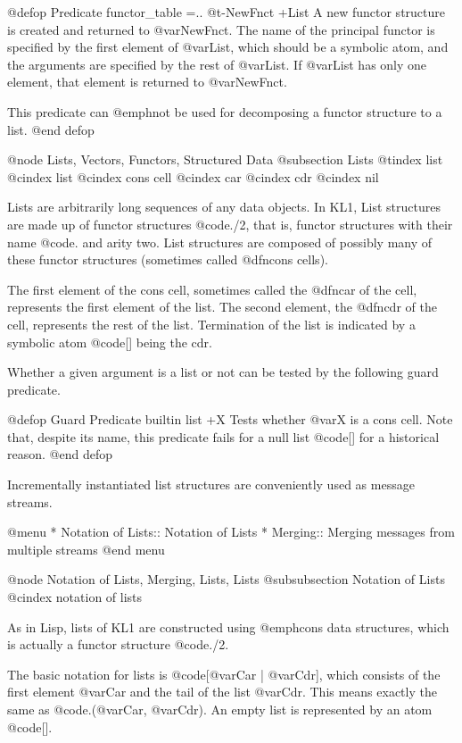 {{@defop {Predicate} {functor_table} =.. @t{-}NewFnct +List
A new functor structure is created and returned to @var{NewFnct}.  The
name of the principal functor is specified by the first element of 
@var{List}, which should be a symbolic atom, and the arguments are
specified by the rest of @var{List}.  If @var{List} has only one
element, that element is returned to @var{NewFnct}.

This predicate can @emph{not} be used for decomposing a functor
structure to a list.
@end defop

@node Lists, Vectors, Functors, Structured Data
@subsection Lists
@tindex list
@cindex list
@cindex cons cell
@cindex car
@cindex cdr
@cindex nil

Lists are arbitrarily long sequences of any data objects.  In KL1, List
structures are made up of functor structures @code{./2}, that is,
functor structures with their name @code{.} and arity two.  List
structures are composed of possibly many of these functor structures
(sometimes called @dfn{cons cells}).

The first element of the cons cell, sometimes called the @dfn{car} of
the cell, represents the first element of the list.  The second element,
the @dfn{cdr} of the cell, represents the rest of the list.  Termination
of the list is indicated by a symbolic atom @code{[]} being the cdr.

Whether a given argument is a list or not can be tested by the following
guard predicate.

@defop {Guard Predicate} {builtin} list +X
Tests whether @var{X} is a cons cell.  Note that, despite its name, this
predicate fails for a null list @code{[]} for a historical reason.
@end defop

Incrementally instantiated list structures are conveniently used as
message streams.

@menu
* Notation of Lists::           Notation of Lists
* Merging::                     Merging messages from multiple streams
@end menu

@node Notation of Lists, Merging, Lists, Lists
@subsubsection Notation of Lists
@cindex notation of lists

As in Lisp, lists of KL1 are constructed using @emph{cons} data
structures, which is actually a functor structure @code{./2}.

The basic notation for lists is @code{[@var{Car} | @var{Cdr}]}, which
consists of the first element @var{Car} and the tail of the list
@var{Cdr}.  This means exactly the same as @code{.(@var{Car},
@var{Cdr})}.  An empty list is represented by an atom @code{[]}.

}}
